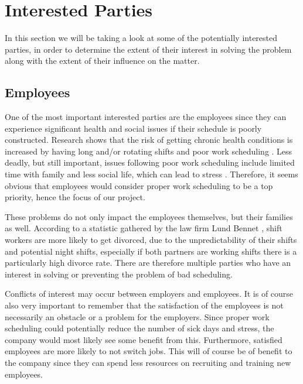 \section{Interested Parties}
In this section we will be taking a look at some of the potentially interested parties, in order to determine the extent of their interest in solving the problem along with the extent of their influence on the matter.

\subsection{Employees}

One of the most important interested parties are the employees since they can experience significant health and social issues if their schedule is poorly constructed. Research shows that the risk of getting chronic health conditions is increased by having long and/or rotating shifts and poor work scheduling \parencite{mchugh_qualitative_2020}. Less deadly, but still important, issues following poor work scheduling include limited time with family and less social life, which can lead to stress \parencite{stephanie_willett_7_2019}. Therefore, it seems obvious that employees would consider proper work scheduling to be a top priority, hence the focus of our project.

These problems do not only impact the employees themselves, but their families as well. According to a statistic gathered by the law firm Lund Bennet \parencite{lund_bennet_rise_2017-1}, shift workers are more likely to get divorced, due to the unpredictability of their shifts and potential night shifts, especially if both partners are working shifts there is a particularly high divorce rate. There are therefore multiple parties who have an interest in solving or preventing the problem of bad scheduling.

Conflicts of interest may occur between employers and employees. It is of course also very important to remember that the satisfaction of the employees is not necessarily an obstacle or a problem for the employers. Since proper work scheduling could potentially reduce the number of sick days and stress, the company would most likely see some benefit from this. Furthermore, satisfied employees are more likely to not switch jobs. This will of course be of benefit to the company since they can spend less resources on recruiting and training new employees. \parencite{daniel_sgroi_happiness_nodate}

